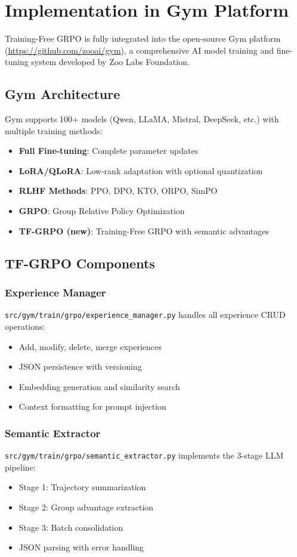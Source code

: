 \section{Implementation in Gym Platform}

\label{sec:implementation}

Training-Free GRPO is fully integrated into the open-source Gym platform (\url{https://github.com/zooai/gym}), a comprehensive AI model training and fine-tuning system developed by Zoo Labs Foundation.

\subsection{Gym Architecture}

Gym supports 100+ models (Qwen, LLaMA, Mistral, DeepSeek, etc.) with multiple training methods:
\begin{itemize}
    \item \textbf{Full Fine-tuning}: Complete parameter updates
    \item \textbf{LoRA/QLoRA}: Low-rank adaptation with optional quantization
    \item \textbf{RLHF Methods}: PPO, DPO, KTO, ORPO, SimPO
    \item \textbf{GRPO}: Group Relative Policy Optimization
    \item \textbf{TF-GRPO (new)}: Training-Free GRPO with semantic advantages
\end{itemize}

\subsection{TF-GRPO Components}

\subsubsection{Experience Manager}
\texttt{src/gym/train/grpo/experience\_manager.py} handles all experience CRUD operations:
\begin{itemize}
    \item Add, modify, delete, merge experiences
    \item JSON persistence with versioning
    \item Embedding generation and similarity search
    \item Context formatting for prompt injection
\end{itemize}

\subsubsection{Semantic Extractor}
\texttt{src/gym/train/grpo/semantic\_extractor.py} implements the 3-stage LLM pipeline:
\begin{itemize}
    \item Stage 1: Trajectory summarization
    \item Stage 2: Group advantage extraction
    \item Stage 3: Batch consolidation
    \item JSON parsing with error handling
\end{itemize}

